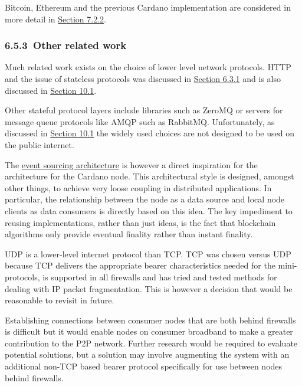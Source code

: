 \documentclass[]{article}
\begin{document}
Bitcoin, Ethereum and the previous Cardano implementation are considered
in more detail in
\protect\hyperlink{comparison-with-previous-network-implementations}{{Section
7.2.2}}.

\hypertarget{other-related-work}{%
\subsubsection{​6.5.3​~Other related work}\label{other-related-work}}

Much related work exists on the choice of lower level network protocols.
HTTP and the issue of stateless protocols was discussed in
\protect\hyperlink{stateful-versus-stateless-protocols}{{Section 6.3.1}}
and is also discussed in
\protect\hyperlink{stateful-implementation}{{Section 10.1}}.

Other stateful protocol layers include libraries such as ZeroMQ or
servers for message queue protocols like AMQP such as RabbitMQ.
Unfortunately, as discussed in
\protect\hyperlink{stateful-implementation}{{Section 10.1}} the widely
used choices are not designed to be used on the public internet.

The \href{https://martinfowler.com/eaaDev/EventSourcing.html}{{event
sourcing architecture}} is however a direct inspiration for the
architecture for the Cardano node. This architectural style is designed,
amongst other things, to achieve very loose coupling in distributed
applications. In particular, the relationship between the node as a data
source and local node clients as data consumers is directly based on
this idea. The key impediment to reusing implementations, rather than
just ideas, is the fact that blockchain algorithms only provide eventual
finality rather than instant finality.

UDP is a lower-level internet protocol than TCP. TCP was chosen versus
UDP because TCP delivers the appropriate bearer characteristics needed
for the mini-protocols, is supported in all firewalls and has tried and
tested methods for dealing with IP packet fragmentation. This is however
a decision that would be reasonable to revisit in future.

Establishing connections between consumer nodes that are both behind
firewalls is difficult but it would enable nodes on consumer broadband
to make a greater contribution to the P2P network. Further research
would be required to evaluate potential solutions, but a solution may
involve augmenting the system with an additional non-TCP based bearer
protocol specifically for use between nodes behind firewalls.
\end{document}
